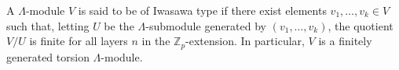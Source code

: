 A $\Lambda$-module $V$ is said to be of Iwasawa type if there exist elements $v_1, \ldots, v_k \in V$ such that, letting $U$ be the $\Lambda$-submodule generated by $(v_1, \ldots, v_k)$, the quotient $V/U$ is finite for all layers $n$ in the $\mathbb{Z}_p$-extension. In particular, $V$ is a finitely generated torsion $\Lambda$-module.
